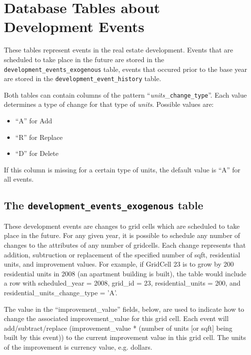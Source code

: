 \section{Database Tables about Development Events}
\label{sec:db-tables-events}
These tables represent events in the real estate development. Events that are scheduled 
to take place in the future are stored in the {\tt development_events_exogenous} table,
events that occured prior to the base year are stored in the {\tt development_event_history} table.

Both tables can contain columns of the pattern ``{\it units}_{\tt change_type}''. Each value determines
a type of change for that type of {\it units}. Possible values are:
\begin{itemize} \tight
\item ``A'' for Add
\item ``R'' for Replace
\item ``D'' for Delete
\end{itemize}
If this column is missing for a certain type of units, the default value is ``A'' for all events.

\subsection{The {\tt development_events_exogenous} table}

These development events are changes to grid cells which are scheduled to take
place
in the future. For any given year, it is possible to schedule any number of
changes to the attributes of any number of gridcells. Each change represents
that addition, subtruction or replacement of the specified number of sqft, residential units, and
improvement values.  For example, if
GridCell 23 is to grow by 200 residential units in 2008 (an apartment building
is built), the table would include a row with scheduled_year = 2008, grid_id =
23, residential_units = 200, and residential_units_change_type = 'A'.

The value in the ``improvement_value'' fields, below, are used to indicate how
to change the associated improvement_value for this grid cell. Each event will
add/subtract/replace (improvement_value * (number
of units [or sqft] being built by this event)) to the current improvement value
in
this grid cell.  The units of the improvement is currency value, e.g. dollars.

